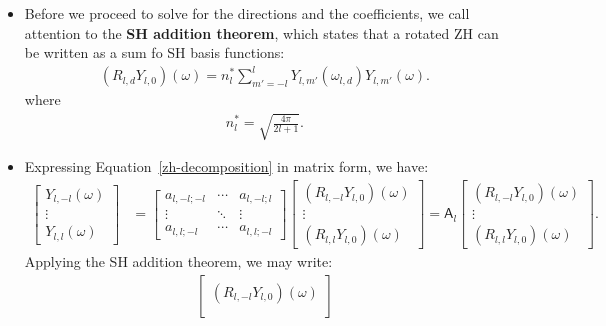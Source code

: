 \documentclass[10pt]{article}
\begin{document}
\begin{itemize}
        \item Before we proceed to solve for the directions and the coefficients, we call attention to the \textbf{SH addition theorem}, which states that a rotated ZH can be written as a sum fo SH basis functions:
        \begin{align*}
            (R_{l,d} Y_{l,0})(\omega) = n_l^* \sum_{m'=-l}^l Y_{l,m'}(\omega_{l,d}) Y_{l,m'}(\omega).
        \end{align*}
        where
        \begin{align*}
            n_l^* = \sqrt{\frac{4\pi}{2l+1}}.
        \end{align*}

        \item Expressing Equation~\eqref{zh-decomposition} in matrix form, we have:
        \begin{align*}
            \begin{bmatrix}
                Y_{l,-l}(\omega) \\
                \vdots \\
                Y_{l,l}(\omega)
            \end{bmatrix}
            &=
            \begin{bmatrix}
                a_{l,-l;-l} & \cdots & a_{l,-l;l} \\
                \vdots & \ddots & \vdots \\
                a_{l,l;-l} & \cdots & a_{l,l;-l}
            \end{bmatrix}
            \begin{bmatrix}
                (R_{l,-l} Y_{l,0}) (\omega) \\
                \vdots \\
                (R_{l,l} Y_{l,0}) (\omega)
            \end{bmatrix}
            = 
            \mathsf{A}_l
            \begin{bmatrix}
                (R_{l,-l} Y_{l,0}) (\omega) \\
                \vdots \\
                (R_{l,l} Y_{l,0}) (\omega)
            \end{bmatrix}.
        \end{align*}
        Applying the SH addition theorem, we may write:
        \begin{align*}
            \begin{bmatrix}
                (R_{l,-l} Y_{l,0}) (\omega) \\

\end{bmatrix}
\end{align*}
\end{itemize}
\end{document}

